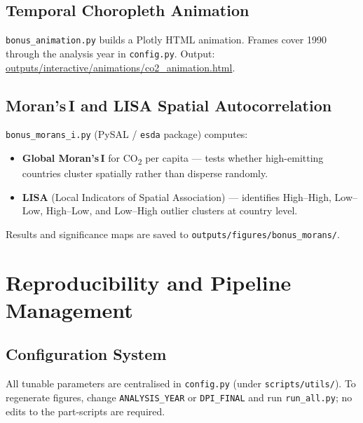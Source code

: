 \documentclass[12pt, a4paper, oneside]{report}
\begin{document}
\section{Temporal Choropleth Animation}

\texttt{bonus\_animation.py} builds a Plotly HTML animation.
Frames cover 1990 through the analysis year in \texttt{config.py}.
Output: \url{outputs/interactive/animations/co2_animation.html}.

\section{Moran's\,I and LISA Spatial Autocorrelation}

\texttt{bonus\_morans\_i.py} (PySAL / \texttt{esda} package) computes:

\begin{itemize}[leftmargin=2em, label=\textcolor{accent}{\textbullet}]
  \item \textbf{Global Moran's\,I} for CO\textsubscript{2} per capita --- tests whether
        high-emitting countries cluster spatially rather than disperse randomly.
  \item \textbf{LISA} (Local Indicators of Spatial Association) --- identifies
        High--High, Low--Low, High--Low, and Low--High outlier clusters at country level.
\end{itemize}

Results and significance maps are saved to
\texttt{outputs/figures/bonus\_morans/}.

\chapter{Reproducibility and Pipeline Management}

\section{Configuration System}

All tunable parameters are centralised in \texttt{config.py} (under \texttt{scripts/utils/}).
To regenerate figures, change \texttt{ANALYSIS\_YEAR} or \texttt{DPI\_FINAL} and run
\texttt{run\_all.py}; no edits to the part-scripts are required.
\end{document}
